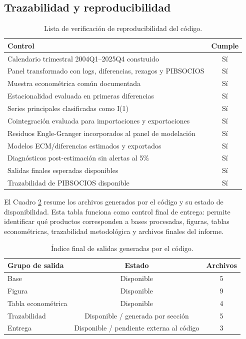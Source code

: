 \documentclass[11pt]{article}
\begin{document}
\subsection{Trazabilidad y reproducibilidad}
\label{subsec:trazabilidad-reproducibilidad}

\begin{table}[H]
\centering
\caption{Lista de verificación de reproducibilidad del código.}
\label{tab:checklist-reproducibilidad}
\footnotesize
\begin{tabular}{p{10.5cm}c}
\toprule
Control & Cumple \\
\midrule
Calendario trimestral 2004Q1--2025Q4 construido & Sí \\
Panel transformado con logs, diferencias, rezagos y PIBSOCIOS & Sí \\
Muestra econométrica común documentada & Sí \\
Estacionalidad evaluada en primeras diferencias & Sí \\
Series principales clasificadas como I(1) & Sí \\
Cointegración evaluada para importaciones y exportaciones & Sí \\
Residuos Engle-Granger incorporados al panel de modelación & Sí \\
Modelos ECM/diferencias estimados y exportados & Sí \\
Diagnósticos post-estimación sin alertas al 5\% & Sí \\
Salidas finales esperadas disponibles & Sí \\
Trazabilidad de PIBSOCIOS disponible & Sí \\
\bottomrule
\end{tabular}
\end{table}

El Cuadro \ref{tab:indice-salidas} resume los archivos generados por el código y
su estado de disponibilidad. Esta tabla funciona como control final de entrega:
permite identificar qué productos corresponden a bases procesadas, figuras,
tablas econométricas, trazabilidad metodológica y archivos finales del informe.

\begin{table}[H]
\centering
\caption{Índice final de salidas generadas por el código.}
\label{tab:indice-salidas}
\small
\begin{tabular}{lcc}
\toprule
Grupo de salida & Estado & Archivos \\
\midrule
Base & Disponible & 5 \\
Figura & Disponible & 9 \\
Tabla econométrica & Disponible & 4 \\
Trazabilidad & Disponible / generada por sección & 5 \\
Entrega & Disponible / pendiente externa al código & 3 \\
\bottomrule
\end{tabular}
\end{table}
\end{document}
